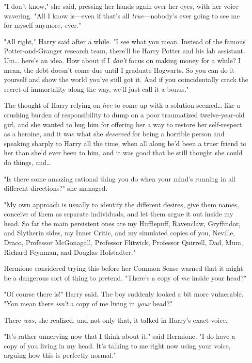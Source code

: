 "I don't know," she said, pressing her hands again over her eyes, with her
voice wavering. "All I know is---even if that's all \emph{true}---nobody's ever
going to see me for myself anymore, ever."

"All right," Harry said after a while. "I see what you mean. Instead of the
famous Potter-and-Granger research team, there'll be Harry Potter and his lab
assistant. Um{\ldots} here's an idea. How about if I \emph{don't} focus on
making money for a while? I mean, the debt doesn't come due until I graduate
Hogwarts. So you can do it yourself and show the world you've still got it. And
if you coincidentally crack the secret of immortality along the way, we'll just
call it a bonus."

The thought of Harry relying on \emph{her} to come up with a solution
seemed{\ldots} like a crushing burden of responsibility to dump on a poor
traumatized twelve-year-old girl, and she wanted to hug him for offering her a
way to restore her self-respect as a heroine, and it was what she
\emph{deserved} for being a horrible person and speaking sharply to Harry all
the time, when all along he'd been a truer friend to her than she'd ever been
to him, and it was good that he still thought she could do things, and{\ldots}

"Is there some amazing rational thing you do when your mind's running in all
different directions?" she managed.

"My own approach is usually to identify the different desires, give them names,
conceive of them as separate individuals, and let them argue it out inside my
head. So far the main persistent ones are my Hufflepuff, Ravenclaw, Gryffindor,
and Slytherin sides, my Inner Critic, and my simulated copies of you, Neville,
Draco, Professor McGonagall, Professor Flitwick, Professor Quirrell, Dad, Mum,
Richard Feynman, and Douglas Hofstadter."

Hermione considered trying this before her Common Sense warned that it might be
a dangerous sort of thing to pretend. "There's a copy of \emph{me} inside your
head?"

"Of course there is!" Harry said. The boy suddenly looked a bit more
vulnerable. "You mean there \emph{isn't} a copy of me living in \emph{your}
head?"

There \emph{was,} she realized; and not only that, it talked in Harry's exact
voice.

"It's rather unnerving now that I think about it," said Hermione. "I do have a
copy of you living in my head. It's talking to me right now using your voice,
arguing how this is perfectly normal."


